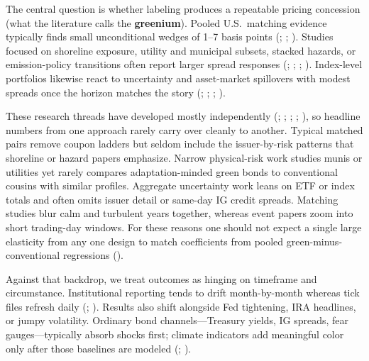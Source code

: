 \documentclass[
  11pt,
]{article}
\begin{document}
The central question is whether labeling produces a repeatable pricing concession (what the literature calls the \textbf{greenium}). Pooled U.S.\ matching evidence typically finds small unconditional wedges of 1--7 basis points (; ; ). Studies focused on shoreline exposure, utility and municipal subsets, stacked hazards, or emission-policy transitions often report larger spread responses (; ; ; ). Index-level portfolios likewise react to uncertainty and asset-market spillovers with modest spreads once the horizon matches the story (; ; ; ).

These research threads have developed mostly independently (; ; ; ; ), so headline numbers from one approach rarely carry over cleanly to another. Typical matched pairs remove coupon ladders but seldom include the issuer-by-risk patterns that shoreline or hazard papers emphasize. Narrow physical-risk work studies munis or utilities yet rarely compares adaptation-minded green bonds to conventional cousins with similar profiles. Aggregate uncertainty work leans on ETF or index totals and often omits issuer detail or same-day IG credit spreads. Matching studies blur calm and turbulent years together, whereas event papers zoom into short trading-day windows. For these reasons one should not expect a single large elasticity from any one design to match coefficients from pooled green-minus-conventional regressions ().

Against that backdrop, we treat outcomes as hinging on timeframe and circumstance. Institutional reporting tends to drift month-by-month whereas tick files refresh daily (; ). Results also shift alongside Fed tightening, IRA headlines, or jumpy volatility. Ordinary bond channels---Treasury yields, IG spreads, fear gauges---typically absorb shocks first; climate indicators add meaningful color only after those baselines are modeled (; ).
\end{document}
